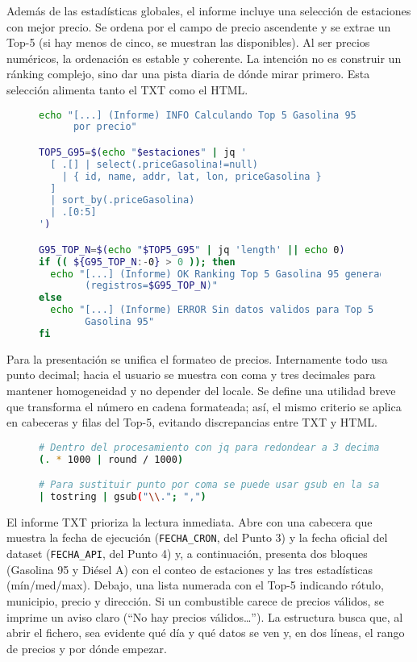 Además de las estadísticas globales, el informe incluye una selección de estaciones con mejor precio. Se ordena por el campo de precio ascendente y se extrae un Top-5 (si hay menos de cinco, se muestran las disponibles). Al ser precios numéricos, la ordenación es estable y coherente. La intención no es construir un ránking complejo, sino dar una pista diaria de dónde mirar primero. Esta selección alimenta tanto el TXT como el HTML.

\begin{figure}[H]
  \begin{lstlisting}[language=bash, caption={Figura 5.2 — Selección del Top-5 por combustible}]
echo "[...] (Informe) INFO Calculando Top 5 Gasolina 95 
      por precio"

TOP5_G95=$(echo "$estaciones" | jq '
  [ .[] | select(.priceGasolina!=null)
    | { id, name, addr, lat, lon, priceGasolina }
  ]
  | sort_by(.priceGasolina)
  | .[0:5]
')

G95_TOP_N=$(echo "$TOP5_G95" | jq 'length' || echo 0)
if (( ${G95_TOP_N:-0} > 0 )); then
  echo "[...] (Informe) OK Ranking Top 5 Gasolina 95 generado 
        (registros=$G95_TOP_N)"
else
  echo "[...] (Informe) ERROR Sin datos validos para Top 5 
        Gasolina 95"
fi
\end{lstlisting}
\end{figure}

Para la presentación se unifica el formateo de precios. Internamente todo usa punto decimal; hacia el usuario se muestra con coma y tres decimales para mantener homogeneidad y no depender del locale. Se define una utilidad breve que transforma el número en cadena formateada; así, el mismo criterio se aplica en cabeceras y filas del Top-5, evitando discrepancias entre TXT y HTML.

\begin{figure}[H]
  \begin{lstlisting}[language=bash, caption={Figura 5.3 — Formateo de precios en jq}]
# Dentro del procesamiento con jq para redondear a 3 decimales:
(. * 1000 | round / 1000)

# Para sustituir punto por coma se puede usar gsub en la salida:
| tostring | gsub("\\."; ",")
\end{lstlisting}
\end{figure}

El informe TXT prioriza la lectura inmediata. Abre con una cabecera que muestra la fecha de ejecución (\texttt{FECHA\_CRON}, del Punto 3) y la fecha oficial del dataset (\texttt{FECHA\_API}, del Punto 4) y, a continuación, presenta dos bloques (Gasolina 95 y Diésel A) con el conteo de estaciones y las tres estadísticas (mín/med/max). Debajo, una lista numerada con el Top-5 indicando rótulo, municipio, precio y dirección. Si un combustible carece de precios válidos, se imprime un aviso claro (``No hay precios válidos…''). La estructura busca que, al abrir el fichero, sea evidente qué día y qué datos se ven y, en dos líneas, el rango de precios y por dónde empezar.

